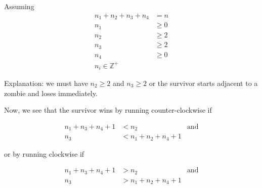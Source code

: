 \documentclass[letterpaper, 10pt]{article}
\newcommand{\Z}{\mathbb{Z}}
\begin{document}
\begin{enumerate}
Assuming
\begin{align*}
  n_1 + n_2 + n_3 + n_4 &= n \\
  n_1 &\geq 0 \\
  n_2 &\geq 2 \\
  n_3 &\geq 2 \\
  n_4 &\geq 0 \\
  n_i \in \Z^{+}
\end{align*}

Explanation: we must have $n_2 \geq 2$ and $n_3 \geq 2$ or the survivor starts adjacent to a zombie and
loses immediately.

Now, we see that the survivor wins by running counter-clockwise if

\begin{align*}
  n_1 + n_3 + n_4 + 1&< n_2 & \text{and}\\
  n_3 &< n_1 + n_2 + n_4 + 1
\end{align*}

or by running clockwise if

\begin{align*}
  n_1 + n_3 + n_4 + 1 &> n_2 & \text{and}\\
  n_3 &> n_1 + n_2 + n_4 + 1
\end{align*}


\end{enumerate}
\end{document}
